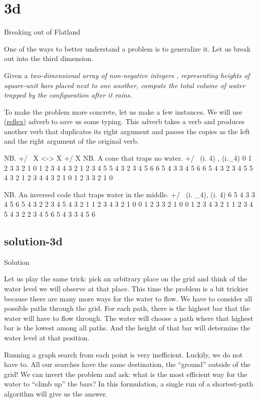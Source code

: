 \documentclass{article}
\begin{document}
\section{3d}{Breaking out of Flatland}

One of the ways to better understand a problem is to generalize it.
Let us break out into the third dimension.

Given a \em{two-dimensional} array of non-negative integers , representing heights of square-unit bars placed next to one another, compute the total \em{volume} of water trapped by the configuration after it rains.

To make the problem more concrete, let us make a few instances.
We will use \href{https://code.jsoftware.com/wiki/Vocabulary/tilde}{\code{~} (reflex)} adverb to save us some typing.
This adverb takes a verb and produces another verb that duplicates its right argument and passes the copies as the left and the right argument of the original verb.

\begin{code}[j]
    NB. +/~ X   <->   X +/ X
    NB. A cone that traps no water.
    +/~  (i. 4) , (i._4)
0 1 2 3 3 2 1 0
1 2 3 4 4 3 2 1
2 3 4 5 5 4 3 2
3 4 5 6 6 5 4 3
3 4 5 6 6 5 4 3
2 3 4 5 5 4 3 2
1 2 3 4 4 3 2 1
0 1 2 3 3 2 1 0

    NB. An inversed code that traps water in the middle.
    +/~  (i. _4), (i. 4)
6 5 4 3 3 4 5 6
5 4 3 2 2 3 4 5
4 3 2 1 1 2 3 4
3 2 1 0 0 1 2 3
3 2 1 0 0 1 2 3
4 3 2 1 1 2 3 4
5 4 3 2 2 3 4 5
6 5 4 3 3 4 5 6
\end{code}

\subsection{solution-3d}{Solution}

Let us play the same trick: pick an arbitrary place on the grid and think of the water level we will observe at that place.
This time the problem is a bit trickier because there are many more ways for the water to flow.
We have to consider all possible paths through the grid.
For each path, there is the highest bar that the water will have to flow through.
The water will choose a path where that highest bar is the lowest among all paths.
And the height of that bar will determine the water level at that position.

Running a graph search from each point is very inefficient.
Luckily, we do not have to.
All our searches have the same destination, the ``ground'' outside of the grid!
We can invert the problem and ask: what is the most efficient way for the water to ``climb up'' the bars?
In this formulation, a single run of a shortest-path algorithm will give us the answer.
\end{document}

